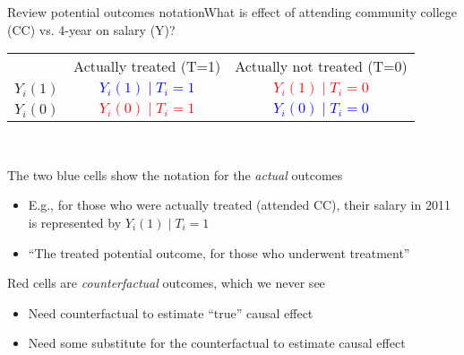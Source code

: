 \begin{frame}{Review potential outcomes notation}{What is effect of attending community college (CC) vs. 4-year on salary (Y)?}
	\begin{tabular}{r|c|c|}
	\multicolumn{1}{r}{}
		 					&  \multicolumn{1}{c}{Actually treated (T=1)} & \multicolumn{1}{c}{Actually not treated (T=0)} \\
		\cline{2-3}
		\(Y_i(1)\) & \textcolor{blue}{ \(Y_i(1) \mid T_i=1\)} & \textcolor{red}{\(Y_i(1) \mid T_i=0\)}  \\
		\cline{2-3}
		\(Y_i(0)\) & \textcolor{red}{\(Y_i(0) \mid T_i=1\)} & \textcolor{blue}{\(Y_i(0) \mid T_i=0\)}  \\
		\cline{2-3}
	\end{tabular}
	\\
	\vspace{5 mm}
	
	The two blue cells show the notation for the \emph{actual} outcomes
	\begin{itemize}
	\item E.g., for those who were actually treated (attended CC), their salary in 2011 is represented by \(Y_i(1) \mid T_i=1\)
	\item ``The treated potential outcome, for those who underwent treatment''
	\end{itemize}
	\vspace{3 mm}	
	Red cells are \emph{counterfactual} outcomes, which we never see
	\begin{itemize}
		\item Need counterfactual to estimate ``true'' causal effect
		\item Need some substitute for the counterfactual to estimate causal effect
	\end{itemize}
\end{frame}


